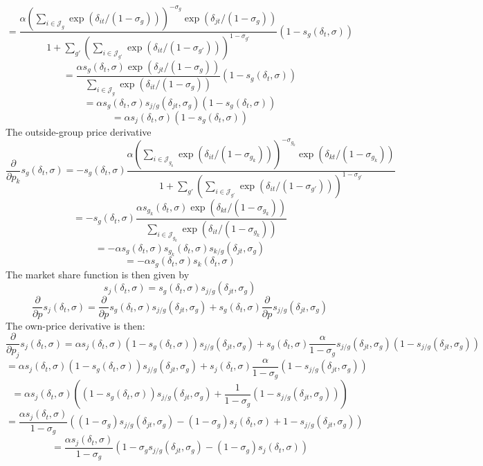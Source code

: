 \documentclass[10pt,letter]{article}
\begin{document}
\[ = \frac{\alpha \left(\sum_{i \in \mathcal{J}_g} \exp(\delta_{it} / (1 - \sigma_g))\right)^{-\sigma_g} \exp(\delta_{jt} / (1 - \sigma_g))}{1 + \sum_{g'}\left(\sum_{i \in \mathcal{J}_{g'}} \exp(\delta_{it} / (1 - \sigma_{g'}))\right)^{1 - \sigma_{g'}}}(1-s_g(\delta_t, \sigma)) \]
\[ = \frac{\alpha s_g(\delta_t, \sigma) \exp(\delta_{jt} / (1 - \sigma_g))}{\sum_{i \in \mathcal{J}_g} \exp(\delta_{it} / (1 - \sigma_g))}(1-s_g(\delta_t, \sigma)) \]
\[ = \alpha s_g(\delta_t, \sigma) s_{j/ g}(\delta_{jt}, \sigma_g)(1-s_g(\delta_t, \sigma)) \]
\[ = \alpha s_j(\delta_t, \sigma)(1-s_g(\delta_t, \sigma)) \]
The outside-group price derivative
\[ \frac{\partial}{\partial p_k}s_{g}(\delta_t, \sigma) =  - s_{g}(\delta_t, \sigma)\frac{\alpha \left(\sum_{i \in \mathcal{J}_{g_k}} \exp(\delta_{it} / (1 - \sigma_{g_k}))\right)^{-\sigma_{g_k}} \exp(\delta_{kt} / (1 - \sigma_{g_k}))}{1 + \sum_{g'}\left(\sum_{i \in \mathcal{J}_{g'}} \exp(\delta_{it} / (1 - \sigma_{g'}))\right)^{1 - \sigma_{g'}}} \]
\[=- s_{g}(\delta_t, \sigma)\frac{\alpha s_{g_k}(\delta_t, \sigma) \exp(\delta_{kt} / (1 - \sigma_{g_k}))}{\sum_{i \in \mathcal{J}_{g_k}} \exp(\delta_{it} / (1 - \sigma_{g_k}))} \]
\[=- \alpha s_{g}(\delta_t, \sigma)s_{g_k}(\delta_t, \sigma) s_{k/ g}(\delta_{jt}, \sigma_g) \]
\[=- \alpha s_{g}(\delta_t, \sigma)s_{k}(\delta_t, \sigma) \]
The market share function is then given by
\[ s_j(\delta_t, \sigma) = s_{g}(\delta_t, \sigma)s_{j/ g}(\delta_{jt}, \sigma_g) \]
\[ \frac{\partial }{\partial p}s_j(\delta_t, \sigma) = \frac{\partial }{\partial p}s_{g}(\delta_t, \sigma)s_{j/ g}(\delta_{jt}, \sigma_g)  + s_{g}(\delta_t, \sigma)\frac{\partial }{\partial p}s_{j/ g}(\delta_{jt}, \sigma_g)\]
The own-price derivative is then:
\[ \frac{\partial }{\partial p_j}s_j(\delta_t, \sigma) = \alpha s_j(\delta_t, \sigma)(1-s_g(\delta_t, \sigma)) s_{j/ g}(\delta_{jt}, \sigma_g)+ s_{g}(\delta_t, \sigma)\frac{\alpha}{1 - \sigma_g}s_{j/ g}(\delta_{jt}, \sigma_g) (1 - s_{j/ g}(\delta_{jt}, \sigma_g)) \]
\[= \alpha s_j(\delta_t, \sigma)(1-s_g(\delta_t, \sigma)) s_{j/ g}(\delta_{jt}, \sigma_g)+ s_{j}(\delta_t, \sigma)\frac{\alpha}{1 - \sigma_g}(1 - s_{j/ g}(\delta_{jt}, \sigma_g)) \]
\[= \alpha s_j(\delta_t, \sigma)\left( (1-s_g(\delta_t, \sigma)) s_{j/ g}(\delta_{jt}, \sigma_g)+ \frac{1}{1 - \sigma_g}(1 - s_{j/ g}(\delta_{jt}, \sigma_g))\right) \]
\[= \frac{\alpha s_j(\delta_t, \sigma)}{1-\sigma_g}\left( (1-\sigma_g)s_{j/ g}(\delta_{jt}, \sigma_g)-(1-\sigma_g)s_j(\delta_t, \sigma) + 1 - s_{j/ g}(\delta_{jt}, \sigma_g)\right) \]
\[= \frac{\alpha s_j(\delta_t, \sigma)}{1-\sigma_g}\left( 1 -\sigma_g s_{j/ g}(\delta_{jt}, \sigma_g)-(1-\sigma_g)s_j(\delta_t, \sigma)  \right) \]
\end{document}
